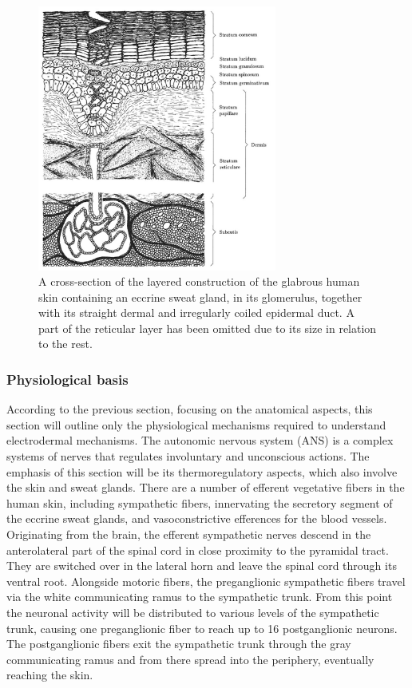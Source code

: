 \begin{figure}[ht]
\centering
\includegraphics[width=0.7\textwidth]{images/skinGlabrous.png}
\caption{A cross-section of the layered construction of the glabrous human skin containing an eccrine sweat gland, in its glomerulus, together with its straight dermal and irregularly coiled epidermal duct. A part of the reticular layer has been omitted due to its size in relation to the rest. \citep{boucsein2013electrodermal}}
\label{glabImg}
\end{figure}

\subsubsection{Physiological basis}
According to the previous section, focusing on the anatomical aspects, this section will outline only the physiological mechanisms required to understand electrodermal mechanisms. 
The autonomic nervous system (ANS) is a complex systems of nerves that regulates involuntary and unconscious actions. The emphasis of this section will be its thermoregulatory aspects, which also involve the skin and sweat glands. 
There are a number of efferent vegetative fibers in the human skin, including sympathetic fibers, innervating the secretory segment of the eccrine sweat glands, and vasoconstrictive efferences for the blood vessels. Originating from the brain, the efferent sympathetic nerves descend in the anterolateral part of the spinal cord in close proximity to the pyramidal tract. They are switched over in the lateral horn and leave the spinal cord through its ventral root. Alongside motoric fibers, the preganglionic sympathetic fibers travel via the white communicating ramus to the sympathetic trunk. From this point the neuronal activity will be distributed to various levels of the sympathetic trunk, causing one preganglionic fiber to reach up to 16 postganglionic neurons. The postganglionic fibers exit the sympathetic trunk through the gray communicating ramus and from there spread into the periphery, eventually reaching the skin.


